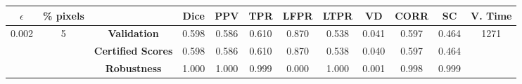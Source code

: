 \begin{longtable}{ c  c | c | c  c  c  c  c  c  c c c}
\toprule \textbf{$\epsilon$} & \textbf{\% pixels} & & \textbf{Dice} & \textbf{PPV} & \textbf{TPR} & \textbf{LFPR} & \textbf{LTPR} & \textbf{VD} & \textbf{CORR} & \textbf{SC} & \textbf{V. Time} \\
\midrule 
\multirow{3}{*}{0.002}  & \multirow{3}{*}{5} &\textbf{Validation} & 0.598 & 0.586 & 0.610 & 0.870 & 0.538 & 0.041 & 0.597 & 0.464 & \multirow{3}{*}{1271} \\
 & & \textbf{Certified Scores} & 0.598 & 0.586 & 0.610 & 0.870 & 0.538 & 0.040 & 0.597 & 0.464 & \\
& & \textbf{Robustness} & 1.000 & 1.000 & 0.999 & 0.000 & 1.000 & 0.001 & 0.998 & 0.999 & \\
\end{longtable}
